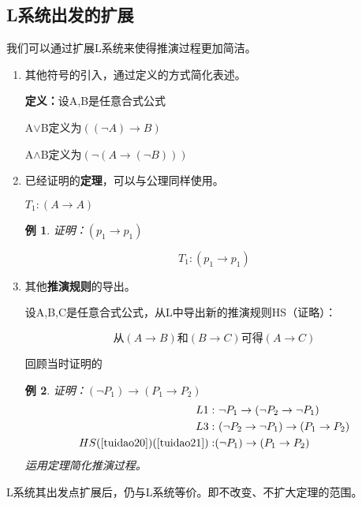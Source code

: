 \documentclass[12pt,onecolumn,a4paper]{book}
\newtheorem*{example}{例}
\numberwithin{table}{subsection}
\numberwithin{equation}{subsection}
\begin{document}
\subsection{L系统出发的扩展}
我们可以通过扩展L系统来使得推演过程更加简洁。

\begin{enumerate}

    \item 其他符号的引入，通过定义的方式简化表述。

    \textbf{定义：}设A,B是任意合式公式

    A$\vee$B定义为$((\neg A)\rightarrow B)$

    A$\wedge$B定义为$(\neg( A\rightarrow(\neg B)))$

    \item 已经证明的\textbf{定理}，可以与公理同样使用。

    $T_1:(A\rightarrow A)$

    \begin{example}
        证明：$(p_1\rightarrow p_1)$

        \begin{equation}
            T_1:(p_1\rightarrow p_1)
        \end{equation}
    \end{example}

    \item 其他\textbf{推演规则}的导出。
    
    设A,B,C是任意合式公式，从L中导出新的推演规则HS（证略）：

    \begin{equation}
        \text{从}(A\rightarrow B)\text{和}(B\rightarrow C)\text{可得}(A\rightarrow C)
    \end{equation}

    回顾当时证明的

    \begin{example}证明：$(\neg P_1) \rightarrow (P_1 \rightarrow P_2)$
        \begin{align}
            L1: & \ \neg P_1 \rightarrow (\neg P_2 \rightarrow \neg P_1) \label{tuidao20} \\
            L3: & \ (\neg P_2 \rightarrow \neg P_1) \rightarrow (P_1 \rightarrow P_2) \label{tuidao21} \\
            HS(\ref{tuidao20})(\ref{tuidao21}): &(\neg P_1) \rightarrow (P_1 \rightarrow P_2)
        \end{align}
        运用定理简化推演过程。
    \end{example}
\end{enumerate}
L系统其出发点扩展后，仍与L系统等价。即不改变、不扩大定理的范围。
\end{document}
